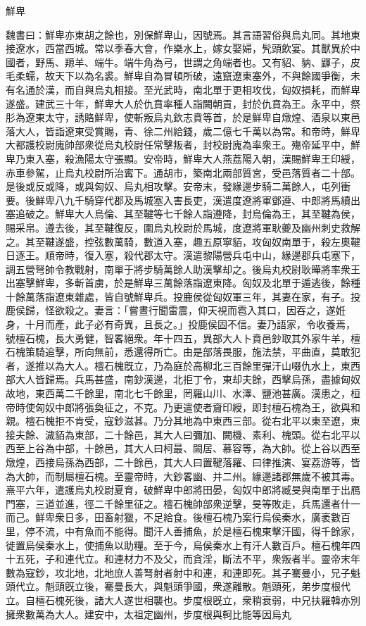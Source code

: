 
\begin{pinyinscope}
鮮卑

魏書曰：鮮卑亦東胡之餘也，別保鮮卑山，因號焉。其言語習俗與烏丸同。其地東接遼水，西當西城。常以季春大會，作樂水上，嫁女娶婦，髠頭飲宴。其獸異於中國者，野馬、羱羊、端牛。端牛角為弓，世謂之角端者也。又有貂、豽、鼲子，皮毛柔蠕，故天下以為名裘。鮮卑自為冒頓所破，遠竄遼東塞外，不與餘國爭衡，未有名通於漢，而自與烏丸相接。至光武時，南北單于更相攻伐，匈奴損耗，而鮮卑遂盛。建武三十年，鮮卑大人於仇賁率種人詣闕朝貢，封於仇賁為王。永平中，祭肜為遼東太守，誘賂鮮卑，使斬叛烏丸欽志賁等首，於是鮮卑自燉煌、酒泉以東邑落大人，皆詣遼東受賞賜，青、徐二州給錢，歲二億七千萬以為常。和帝時，鮮卑大都護校尉廆帥部衆從烏丸校尉任常擊叛者，封校尉廆為率衆王。殤帝延平中，鮮卑乃東入塞，殺漁陽太守張顯。安帝時，鮮卑大人燕荔陽入朝，漢賜鮮卑王印綬，赤車參駕，止烏丸校尉所治寗下。通胡市，築南北兩部質宮，受邑落質者二十部。是後或反或降，或與匈奴、烏丸相攻擊。安帝末，發緣邊步騎二萬餘人，屯列衝要。後鮮卑八九千騎穿代郡及馬城塞入害長吏，漢遣度遼將軍鄧遵、中郎將馬續出塞追破之。鮮卑大人烏倫、其至鞬等七千餘人詣遵降，封烏倫為王，其至鞬為侯，賜采帛。遵去後，其至鞬復反，圍烏丸校尉於馬城，度遼將軍耿夔及幽州刺史救解之。其至鞬遂盛，控弦數萬騎，數道入塞，趣五原寧貊，攻匈奴南單于，殺左奧鞬日逐王。順帝時，復入塞，殺代郡太守。漢遣黎陽營兵屯中山，緣邊郡兵屯塞下，調五營弩帥令教戰射，南單于將步騎萬餘人助漢擊却之。後烏丸校尉耿曄將率衆王出塞擊鮮卑，多斬首虜，於是鮮卑三萬餘落詣遼東降。匈奴及北單于遁逃後，餘種十餘萬落詣遼東雜處，皆自號鮮卑兵。投鹿侯從匈奴軍三年，其妻在家，有子。投鹿侯歸，怪欲殺之。妻言：「嘗晝行聞雷震，仰天視而雹入其口，因吞之，遂姙身，十月而產，此子必有奇異，且長之。」投鹿侯固不信。妻乃語家，令收養焉，號檀石槐，長大勇健，智畧絕衆。年十四五，異部大人卜賁邑鈔取其外家牛羊，檀石槐策騎追擊，所向無前，悉還得所亡。由是部落畏服，施法禁，平曲直，莫敢犯者，遂推以為大人。檀石槐旣立，乃為庭於高柳北三百餘里彈汗山啜仇水上，東西部大人皆歸焉。兵馬甚盛，南鈔漢邊，北拒丁令，東却夫餘，西擊烏孫，盡據匈奴故地，東西萬二千餘里，南北七千餘里，罔羅山川、水澤、鹽池甚廣。漢患之，桓帝時使匈奴中郎將張奐征之，不克。乃更遣使者齎印綬，即封檀石槐為王，欲與和親。檀石槐拒不肯受，寇鈔滋甚。乃分其地為中東西三部。從右北平以東至遼，東接夫餘、濊貊為東部，二十餘邑，其大人曰彌加、闕機、素利、槐頭。從右北平以西至上谷為中部，十餘邑，其大人曰柯最、闕居、慕容等，為大帥。從上谷以西至燉煌，西接烏孫為西部，二十餘邑，其大人曰置鞬落羅、曰律推演、宴荔游等，皆為大帥，而制屬檀石槐。至靈帝時，大鈔畧幽、并二州。緣邊諸郡無歲不被其毒。熹平六年，遣護烏丸校尉夏育，破鮮卑中郎將田晏，匈奴中郎將臧旻與南單于出鴈門塞，三道並進，徑二千餘里征之。檀石槐帥部衆逆擊，旻等敗走，兵馬還者什一而己。鮮卑衆日多，田畜射獵，不足給食。後檀石槐乃案行烏侯秦水，廣袤數百里，停不流，中有魚而不能得。聞汗人善捕魚，於是檀石槐東擊汗國，得千餘家，徙置烏侯秦水上，使捕魚以助糧。至于今，烏侯秦水上有汗人數百戶。檀石槐年四十五死，子和連代立。和連材力不及父，而貪淫，斷法不平，衆叛者半。靈帝末年數為寇鈔，攻北地，北地庶人善弩射者射中和連，和連即死。其子騫曼小，兄子魁頭代立。魁頭旣立後，騫曼長大，與魁頭爭國，衆遂離散。魁頭死，弟步度根代立。自檀石槐死後，諸大人遂世相襲也。步度根旣立，衆稍衰弱，中兄扶羅韓亦別擁衆數萬為大人。建安中，太祖定幽州，步度根與軻比能等因烏丸
\end{pinyinscope}
